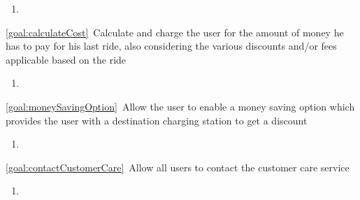 \begin{description}
\begin{enumerate}[label=\textbf{R\arabic*}]
  				\item
   			\end{enumerate}
  		\item \ref{goal:calculateCost}\ Calculate and charge the user for the amount of money he has to pay for his last
  		ride, also considering the various discounts and/or fees applicable based on the ride
  			\begin{enumerate}[label=\textbf{R\arabic*}]
  				\item
   			\end{enumerate}
  		\item \ref{goal:moneySavingOption}\ Allow the user to enable a money saving option which provides the user
  		with a destination charging station to get a discount
  			\begin{enumerate}[label=\textbf{R\arabic*}]
  				\item
   			\end{enumerate}
  		\item \ref{goal:contactCustomerCare}\ Allow all users to contact the customer care service
  			\begin{enumerate}[label=\textbf{R\arabic*}]
  				\item
   			\end{enumerate}
  	\end{description}

